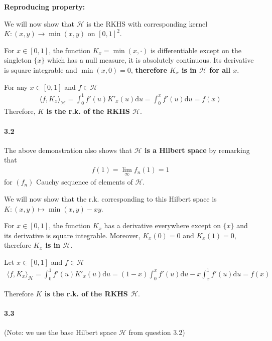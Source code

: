 \documentclass[10pt]{article}
\begin{document}
    \textbf{Reproducing property: }

    We will now show that $\mathcal{H}$ is the RKHS with corresponding kernel 
    $K: (x, y) \rightarrow \min(x, y)$ on $[0, 1]^2$.

    For $x\in [0, 1]$, the function $K_x = \min(x,\cdot)$ is differentiable 
    except on the singleton $\{x\}$ which has a null measure, it is absolutely 
    continuous. Its derivative is square integrable and $\min(x,0) = 0$, 
    \textbf{therefore $K_x$ is in $\mathcal{H}$ for all $x$}.

    For any $x\in [0, 1]$ and $f \in \mathcal{H}$
    \begin{align*}
        \langle f, K_x \rangle_\mathcal{H} = \int_0^1 f'(u)K'_x(u)\text{d}u = 
        \int_0^x f'(u)\text{d}u = f(x)
    \end{align*}
    Therefore, \textbf{$K$ is the r.k. of the RKHS $\mathcal{H}$}.

    \paragraph{3.2} The above demonstration also shows that 
    \textbf{$\mathcal{H}$ is a Hilbert space} by remarking that 
    \begin{align*}
        f(1) = \lim_\infty f_n(1) = 1
    \end{align*} for $(f_n)$ Cauchy sequence of elements of 
    $\mathcal{H}$.
    
    We will now show that the r.k. corresponding to this Hilbert space is $K: 
    (x, y) \mapsto \min(x,y) - xy$. 

    For $x\in[0, 1]$, the function $K_x$ has a derivative everywhere except on 
    $\{x\}$ and its derivative is square integrable. Moreover, $K_x(0) = 0$ and 
    $K_x(1) = 0 $, therefore \textbf{$K_x$ is in $\mathcal{H}$}.

    Let $x\in[0, 1]$ and $f\in \mathcal{H}$
    \begin{align*}
        \langle f, K_x \rangle_\mathcal{H} = \int_0^1 f'(u)K'_x(u)\text{d}u = 
        (1-x)\int_0^x f'(u)\text{d}u - x \int_x^1 f'(u)\text{d}u = f(x)
    \end{align*}

    Therefore \textbf{$K$ is the r.k. of the RKHS $\mathcal{H}$}.

    \paragraph{3.3} (Note: we use the base Hilbert space $\mathcal{H}$ from 
    question 3.2)
    
\end{document}
